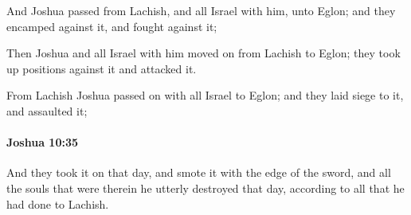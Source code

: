 			\begin{versebox}
					\item[BHS] 
					\item[ASV] And Joshua passed from Lachish, and all Israel with him, unto Eglon; and they encamped against it, and fought against it;
					\item[NIV] Then Joshua and all Israel with him moved on from Lachish to Eglon; they took up positions against it and attacked it.
					\item[NRSV] From Lachish Joshua passed on with all Israel to Eglon; and they laid siege to it, and assaulted it;
			\end{versebox}

		\paragraph{Joshua 10:35} %
			\label{JOSHUA-10-35}

			And they took it on that day, and smote it with the edge of the sword, and all the souls that were therein he utterly destroyed that day, according to all that he had done to Lachish.

